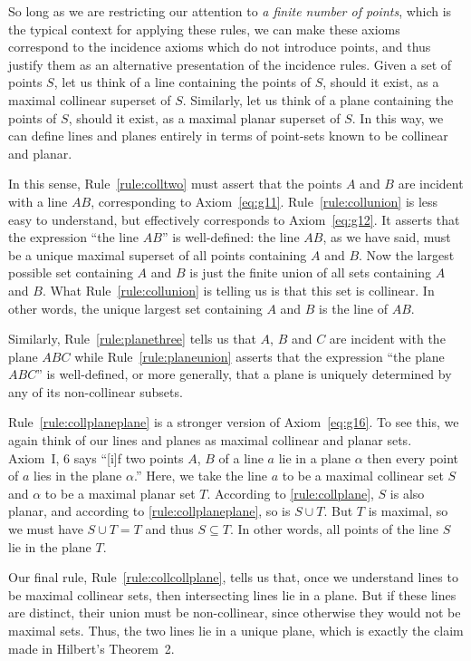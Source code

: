 So long as we are restricting our attention to \emph{a finite number of points}, which is the typical context for applying these rules, we can make these axioms correspond to the incidence axioms which do not introduce points, and thus justify them as an alternative presentation of the incidence rules. Given a set of points $S$, let us think of a line containing the points of $S$, should it exist, as a maximal collinear superset of $S$. Similarly, let us think of a plane containing the points of $S$, should it exist, as a maximal planar superset of $S$. In this way, we can define lines and planes entirely in terms of point-sets known to be collinear and planar. 

In this sense, Rule~\ref{rule:colltwo} must assert that the points $A$ and $B$ are incident with a line $AB$, corresponding to Axiom~\ref{eq:g11}. Rule~\ref{rule:collunion} is less easy to understand, but effectively corresponds to Axiom~\ref{eq:g12}. It asserts that the expression ``the line $AB$'' is well-defined: the line $AB$, as we have said, must be a unique maximal superset of all points containing $A$ and $B$. Now the largest possible set containing $A$ and $B$ is just the finite union of all sets containing $A$ and $B$. What Rule~\ref{rule:collunion} is telling us is that this set is collinear. In other words, the unique largest set containing $A$ and $B$ is the line of $AB$.

Similarly, Rule~\ref{rule:planethree} tells us that $A$, $B$ and $C$ are incident with the plane $ABC$ while Rule~\ref{rule:planeunion} asserts that the expression ``the plane $ABC$'' is well-defined, or more generally, that a plane is uniquely determined by any of its non-collinear subsets.

Rule~\ref{rule:collplaneplane} is a stronger version of Axiom~\ref{eq:g16}. To see this, we again think of our lines and planes as maximal collinear and planar sets. Axiom~I, 6 says ``[i]f two points $A$, $B$ of a line $a$ lie in a plane $\alpha$ then every point of $a$ lies in the plane $\alpha$.'' Here, we take the line $a$ to be a maximal collinear set $S$ and $\alpha$ to be a maximal planar set $T$. According to \ref{rule:collplane}, $S$ is also planar, and according to \ref{rule:collplaneplane}, so is $S \cup T$. But $T$ is maximal, so we must have $S \cup T = T$ and thus $S \subseteq T$. In other words, all points of the line $S$ lie in the plane $T$.

Our final rule, Rule~\ref{rule:collcollplane}, tells us that, once we understand lines to be maximal collinear sets, then intersecting lines lie in a plane. But if these lines are distinct, their union must be non-collinear, since otherwise they would not be maximal sets. Thus, the two lines lie in a unique plane, which is exactly the claim made in Hilbert's Theorem~2. 

